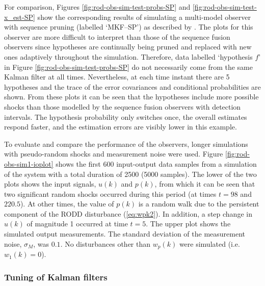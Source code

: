 For comparison, Figures \ref{fig:rod-obs-sim-test-probs-SP} and \ref{fig:rod-obs-sim-test-x_est-SP} show the corresponding results of simulating a multi-model observer with sequence pruning (labelled `MKF--SP') as described by \cite{eriksson_classification_1996}. The plots for this observer are more difficult to interpret than those of the sequence fusion observers since hypotheses are continually being pruned and replaced with new ones adaptively throughout the simulation. Therefore, data labelled `hypothesis $f$' in Figure \ref{fig:rod-obs-sim-test-probs-SP} do not necessarily come from the same Kalman filter at all times. Nevertheless, at each time instant there are 5 hypotheses and the trace of the error covariances and conditional probabilities are shown. From these plots it can be seen that the hypotheses include more possible shocks than those modelled by the sequence fusion observers with detection intervals. The hypothesis probability only switches once, the overall estimates respond faster, and the estimation errors are visibly lower in this example.

To evaluate and compare the performance of the observers, longer simulations with pseudo-random shocks and measurement noise were used. Figure \ref{fig:rod-obs-sim1-ioplot} shows the first 600 input-output data samples from a simulation of the system with a total duration of 2500 (5000 samples). The lower of the two plots shows the input signals, $u(k)$ and $p(k)$, from which it can be seen that two significant random shocks occurred during this period (at times $t=98$ and $220.5$). At other times, the value of $p(k)$ is a random walk due to the persistent component of the \gls{RODD} disturbance (\ref{eq:wpk2}). In addition, a step change in $u(k)$ of magnitude 1 occurred at time $t=5$. The upper plot shows the simulated output measurements. The standard deviation of the measurement noise, $\sigma_M$, was $0.1$. No disturbances other than $w_p(k)$ were simulated (i.e. $w_1(k)=0$).

\subsubsection{Tuning of Kalman filters} \label{sim-obs-lin-1-KF-tuning}

